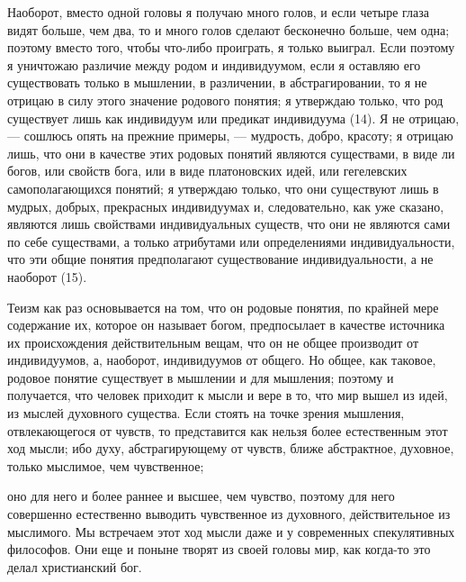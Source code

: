 \documentclass[12pt]{article}
\begin{document}
Наоборот, вместо одной головы я получаю много голов, и если четыре глаза видят больше, чем два, то и много голов сделают бесконечно больше, чем одна; поэтому вместо того, чтобы что-либо проиграть, я только выиграл. Если поэтому я уничтожаю различие между родом и индивидуумом, если я оставляю его существовать только в мышлении, в различении, в абстрагировании, то я не отрицаю в силу этого значение родового понятия; я утверждаю только, что род существует лишь как индивидуум или предикат индивидуума (14). Я не отрицаю, --- сошлюсь опять на прежние примеры, --- мудрость, добро, красоту; я отрицаю лишь, что они в качестве этих родовых понятий являются существами, в виде ли богов, или свойств бога, или в виде платоновских идей, или гегелевских самополагающихся понятий; я утверждаю только, что они существуют лишь в мудрых, добрых, прекрасных индивидуумах и, следовательно, как уже сказано, являются лишь свойствами индивидуальных существ, что они не являются сами по себе существами, а только атрибутами или определениями индивидуальности, что эти общие понятия предполагают существование индивидуальности, а не наоборот (15). 

Теизм как раз основывается на том, что он родовые понятия, по крайней мере содержание их, которое он называет богом, предпосылает в качестве источника их происхождения действительным вещам, что он не общее производит от индивидуумов, а, наоборот, индивидуумов от общего. Но общее, как таковое, родовое понятие существует в мышлении и для мышления; поэтому и получается, что человек приходит к мысли и вере в то, что мир вышел из идей, из мыслей духовного существа. Если стоять на точке зрения мышления, отвлекающегося от чувств, то представится как нельзя более естественным этот ход мысли; ибо духу, абстрагирующему от чувств, ближе абстрактное, духовное, только мыслимое, чем чувственное; 

оно для него и более раннее и высшее, чем чувство, поэтому для него совершенно естественно выводить чувственное из духовного, действительное из мыслимого. Мы встречаем этот ход мысли даже и у современных спекулятивных философов. Они еще и поныне творят из своей головы мир, как когда-то это делал христианский бог. 
\end{document}
